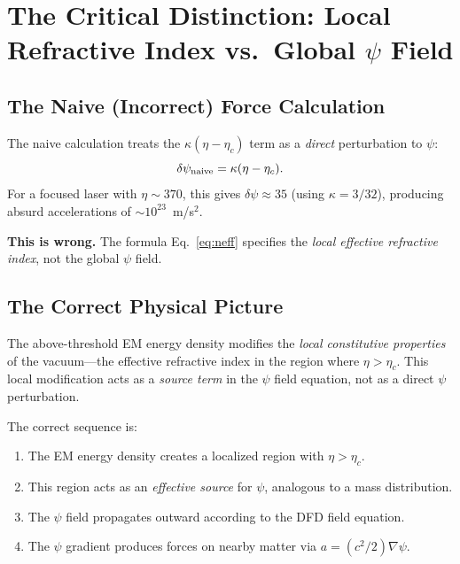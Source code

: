 \documentclass[12pt,a4paper]{article}
\begin{document}
\section{The Critical Distinction: Local Refractive Index vs.\ Global $\psi$ Field}
\label{sec:critical-distinction}

\subsection{The Naive (Incorrect) Force Calculation}

The naive calculation treats the $\kappa(\eta - \eta_c)$ term as a \emph{direct}
perturbation to $\psi$:
\begin{equation}
\delta\psi_{\rm naive} = \kappa(\eta - \eta_c).
\end{equation}
For a focused laser with $\eta \sim 370$, this gives $\delta\psi \approx 35$
(using $\kappa = 3/32$), producing absurd accelerations of $\sim 10^{23}$~m/s$^2$.

\textbf{This is wrong.}  The formula Eq.~\eqref{eq:neff} specifies the
\emph{local effective refractive index}, not the global $\psi$ field.

\subsection{The Correct Physical Picture}

The above-threshold EM energy density modifies the \emph{local constitutive
properties} of the vacuum---the effective refractive index in the region where
$\eta > \eta_c$.  This local modification acts as a \emph{source term} in the
$\psi$ field equation, not as a direct $\psi$ perturbation.

The correct sequence is:
\begin{enumerate}
\item The EM energy density creates a localized region with $\eta > \eta_c$.
\item This region acts as an \emph{effective source} for $\psi$, analogous to
  a mass distribution.
\item The $\psi$ field propagates outward according to the DFD field equation.
\item The $\psi$ gradient produces forces on nearby matter via $a = (c^2/2)\nabla\psi$.
\end{enumerate}
\end{document}
